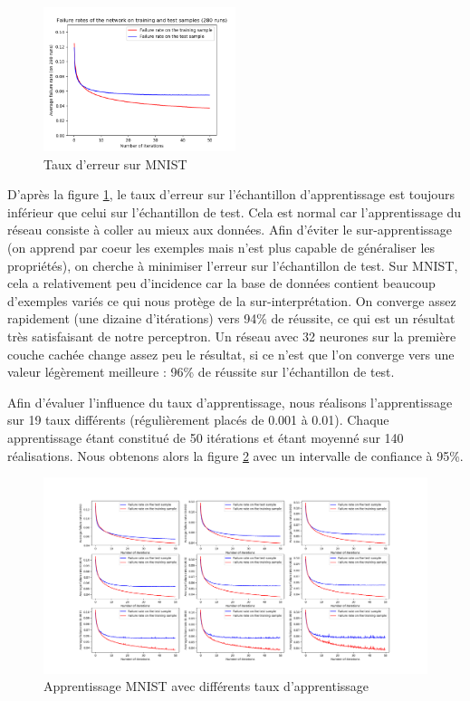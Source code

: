 \begin{figure}[h]
 \centering
 \includegraphics[width=0.5\textwidth]{img/MNIST.png}
 \caption{Taux d'erreur sur MNIST}
 \label{fig:MNIST}
\end{figure}

D'après la figure \ref{fig:MNIST}, le taux d'erreur sur l'échantillon d'apprentissage est toujours inférieur que celui sur l'échantillon de test. Cela est normal car
l'apprentissage du réseau consiste à coller au mieux aux données. Afin d'éviter le sur-apprentissage (on apprend par coeur les exemples mais n'est plus capable de
généraliser les propriétés), on cherche à minimiser l'erreur sur l'échantillon de test. Sur MNIST, cela a relativement peu d'incidence car la base de données contient
beaucoup d'exemples variés ce qui nous protège de la sur-interprétation. On converge assez rapidement (une dizaine d'itérations) vers 94\% de réussite, ce qui est
un résultat très satisfaisant de notre perceptron. Un réseau avec 32 neurones sur la première couche cachée change assez peu le résultat, si ce n'est que 
l'on converge vers une valeur légèrement meilleure : 96\% de réussite sur l'échantillon de test.

Afin d'évaluer l'influence du taux d'apprentissage, nous réalisons l'apprentissage sur 19 taux différents (régulièrement placés de 0.001 à 0.01). Chaque apprentissage
étant constitué de 50 itérations et étant moyenné sur 140 réalisations. Nous obtenons alors la figure \ref{fig:MNIST_difLR} avec un intervalle de confiance à 95\%.

\begin{figure}[ht]
 \centering
 \includegraphics[width=\textwidth]{img/MNIST_difLR.png}
 \caption{Apprentissage MNIST avec différents taux d'apprentissage}
 \label{fig:MNIST_difLR}
\end{figure}

